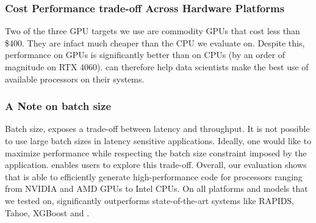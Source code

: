 \subsubsection*{Cost Performance trade-off Across Hardware Platforms}
Two of the three GPU targets we use are commodity GPUs that cost less than \$400. They 
are infact much cheaper than the CPU we evaluate on. Despite this, performance on GPUs
is significantly better than on CPUs (by an order of magnitude on RTX 4060).
\Treebeard{} can therefore help data scientists make the best use of 
available processors on their systems.

\subsubsection*{A Note on batch size}
Batch size, exposes a trade-off between latency and throughput. It is not possible to use 
large batch sizes in latency sensitive applications. 
Ideally, one would like 
to maximize performance while respecting the batch size constraint imposed 
by the application. \Treebeard{} enables users to explore this trade-off.  
\bigbreak
\noindent
Overall, our evaluation shows that \Treebeard{} is able to efficiently generate 
high-performance code for processors ranging from NVIDIA and AMD GPUs to Intel CPUs.
On all platforms and models that we tested on, \Treebeard{} significantly outperforms
state-of-the-art systems like RAPIDS, Tahoe, XGBoost and \TreebeardOLD{}.
